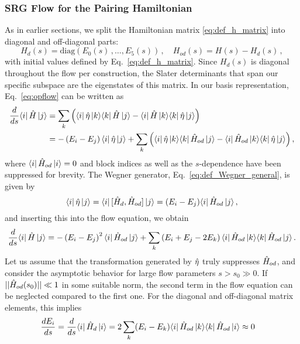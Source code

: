 %
%
\subsubsection{\label{sec:srg_pairing_flow}SRG Flow for the Pairing Hamiltonian}
As in earlier sections, we split the Hamiltonian matrix \eqref{eq:def_h_matrix}
into diagonal and off-diagonal parts:
\begin{equation}
  H_d(s) = \mathrm{diag}(E_0(s)\,,\ldots,E_5(s))\,,\quad H_{od}(s) = H(s) - H_{d}(s)\,,
\end{equation}
with initial values defined by Eq.~\eqref{eq:def_h_matrix}. Since $H_d(s)$
is diagonal throughout the flow per construction, the Slater determinants
that span our specific subspace are the eigenstates of this matrix. In our 
basis representation, Eq.~\eqref{eq:opflow} can be written as
\begin{align}
   \frac{d {}} {d {s}} \langle{i}|\,{\hat{H}}\,|{j}\rangle
  &=\sum_k\left(\langle{i}|\,{\hat{\eta}}\,|{k}\rangle\langle{k}|\,{\hat{H}}\,|{j}\rangle-\langle{i}|\,{\hat{H}}\,|{k}\rangle\langle{k}|\,{\hat{\eta}}\,|{j}\rangle\right)\notag\\
  &=-\left(E_i-E_j\right)\langle{i}|\,{\hat{\eta}}\,|{j}\rangle
    +\sum_k\left(\langle{i}|\,{\hat{\eta}}\,|{k}\rangle\langle{k}|\,{\hat{H}_{od}}\,|{j}\rangle-\langle{i}|\,{\hat{H}_{od}}\,|{k}\rangle\langle{k}|\,{\hat{\eta}}\,|{j}\rangle\right),
\end{align}
where $\langle{i}|\,{\hat{H}_{od}}\,|{i}\rangle=0$ and block indices as well as the $s$-dependence
have been suppressed for brevity. The Wegner generator, Eq.~\eqref{eq:def_Wegner_general}, 
is given by
\begin{equation}
  \langle{i}|\,{\hat{\eta}}\,|{j}\rangle=\langle{i}|\,{[{\hat{H}_d},{\hat{H}_{od}}]}\,|{j}\rangle=(E_i-E_j)\langle{i}|\,{\hat{H}_{od}}\,|{j}\rangle\,,
\end{equation}
and inserting this into the flow equation, we obtain
\begin{align}
  \totd{}{s}\matrixe{i}{\HO}{j}
  =-\left(E_i-E_j\right)^2\matrixe{i}{\HO_{od}}{j}
  +\sum_k\left(E_i+E_j-2E_k\right)\matrixe{i}{\HO_{od}}{k}\matrixe{k}{\HO_{od}}{j}\,.\label{eq:schema_wegner}
\end{align}
Let us assume that the transformation generated by $\hat{\eta}$ truly suppresses 
$\hat{H}_{od}$, and consider the asymptotic behavior for large flow parameters 
$s>s_0\gg0$. If $||\hat{H}_{od}(s_0)||\ll 1$ in some suitable norm, the second 
term in the flow equation can be neglected compared to the first one. For
the diagonal and off-diagonal matrix elements, this implies
\begin{align}
   \frac{d {E_i}} {d {s}}  &=  \frac{d {}} {d {s}}  \langle{i}|\,{\hat{H}_d}\,|{i}\rangle = 2\sum_k (E_i - E_k) \langle{i}|\,{\hat{H}_{od}}\,|{k}\rangle\langle{k}|\,{\hat{H}_{od}}\,|{i}\rangle
  \approx0
\end{align}
